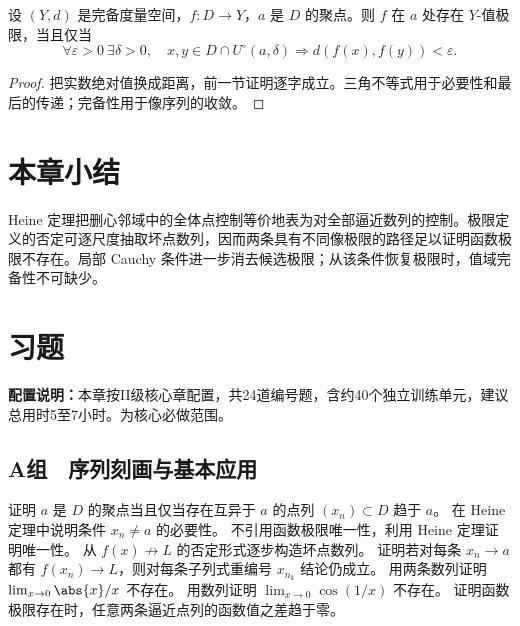 \begin{theorem}[完备值域版本]
设 \((Y,d)\) 是完备度量空间，\(f:D\to Y\)，\(a\) 是 \(D\) 的聚点。则 \(f\) 在 \(a\) 处存在 \(Y\)-值极限，当且仅当
\[
 \forall\varepsilon>0\ \exists\delta>0,\quad
 x,y\in D\cap U^\circ(a,\delta)
 \Longrightarrow d(f(x),f(y))<\varepsilon.
\]
\end{theorem}

\begin{proof}
把实数绝对值换成距离，前一节证明逐字成立。三角不等式用于必要性和最后的传递；完备性用于像序列的收敛。
\end{proof}

\section*{本章小结}

Heine 定理把删心邻域中的全体点控制等价地表为对全部逼近数列的控制。极限定义的否定可逐尺度抽取坏点数列，因而两条具有不同像极限的路径足以证明函数极限不存在。局部 Cauchy 条件进一步消去候选极限；从该条件恢复极限时，值域完备性不可缺少。

\section*{习题}

\noindent\textbf{配置说明：}本章按II级核心章配置，共24道编号题，含约40个独立训练单元，建议总用时5至7小时。为核心必做范围。

\subsection*{A组　序列刻画与基本应用}
\begin{enumerate}[label=\textbf{15.\arabic*.}]
  \mustdo 证明 \(a\) 是 \(D\) 的聚点当且仅当存在互异于 \(a\) 的点列 \((x_n)\subset D\) 趋于 \(a\)。
  \mustdo 在 Heine 定理中说明条件 \(x_n\ne a\) 的必要性。
  \mustdo 不引用函数极限唯一性，利用 Heine 定理证明唯一性。
  \mustdo 从 \(f(x)\not\to L\) 的否定形式逐步构造坏点数列。
  \mustdo 证明若对每条 \(x_n\to a\) 都有 \(f(x_n)\to L\)，则对每条子列式重编号 \(x_{n_k}\) 结论仍成立。
  \mustdo 用两条数列证明 \(\lim_{x\to0}\abs{x}/x\) 不存在。
  \mustdo 用数列证明 \(\lim_{x\to0}\cos(1/x)\) 不存在。
  \mustdo 证明函数极限存在时，任意两条逼近点列的函数值之差趋于零。
\end{enumerate}


